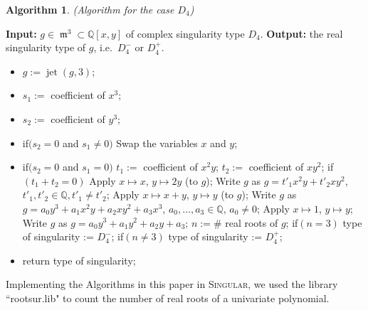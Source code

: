 \documentclass{amsproc}
\DeclareMathOperator{\m}{\mathfrak{m}}
\DeclareMathOperator{\jt}{jet}
\begin{document}
\newtheorem{D[4]}[kjet]{Algorithm}
\begin{D[4]}(Algorithm for the case $D_4$)\label{D[4]}
\end{D[4]}
\noindent\textnormal{\bf Input:} $g\in \m^3\subset\mathbb Q[x,y]$ of complex
singularity type $D_4$.\newline
\textnormal{\bf Output:} the real singularity type of $g$, i.e.~$D_4^-$
or $D_4^+$.
\begin{itemize}
\item $g := \jt(g,3)$;
\item $s_1:=$ coefficient of ${x^3}$;
\item $s_2 :=$ coefficient of ${y^3}$;
\item if$(s_2=0$ and $s_1\neq0)$\newline
\phantom{}\quad Swap the variables $x$ and $y$;
\item   if$(s_2=0$ and $s_1=0)$\newline
\phantom{}\quad $t_1:=$ coefficient of ${x^2y}$;\newline
\phantom{}\quad $t_2:=$ coefficient of ${xy^2}$;\newline
\phantom{}\quad if$(t_1+t_2=0)$\newline
\phantom{}\quad\quad Apply $x\mapsto x$, $y\mapsto 2y$ (to $g$);\newline
\phantom{}\quad\quad Write $g$ as $g=t'_1x^2y+t'_2xy^2$, $t'_1, t'_2\in\mathbb
Q, t'_1\neq t'_2$;\newline
\phantom{}\quad Apply $x\mapsto x+y$, $y\mapsto y$ (to $g$);\newline
\phantom{}\quad Write $g$ as $g=a_0y^3+a_1x^2y+a_2xy^2+a_3x^3$, $a_0,\ldots,a_3\in\mathbb
Q$, $a_0\neq 0$;\newline
\phantom{}\quad Apply $x\mapsto 1$, $y\mapsto y$;\newline
\phantom{}\quad Write $g$ as $g=a_0y^3+a_1y^2+a_2y+a_3$;\newline
\phantom{}\quad $n:= \#$ real roots of $g$;\newline
\phantom{}\quad if$(n=3)$\newline
\phantom{}\quad\quad type of singularity := $D_4^-$;\newline
\phantom{}\quad if$(n\neq 3)$\newline
\phantom{}\quad\quad type of singularity := $D_4^+$;
\item return type of singularity;
\end{itemize}

Implementing  the Algorithms in this paper in \textsc{Singular}, we used the library ``rootsur.lib" \cite{roots} to count the number of real roots of a univariate polynomial.
\end{document}
